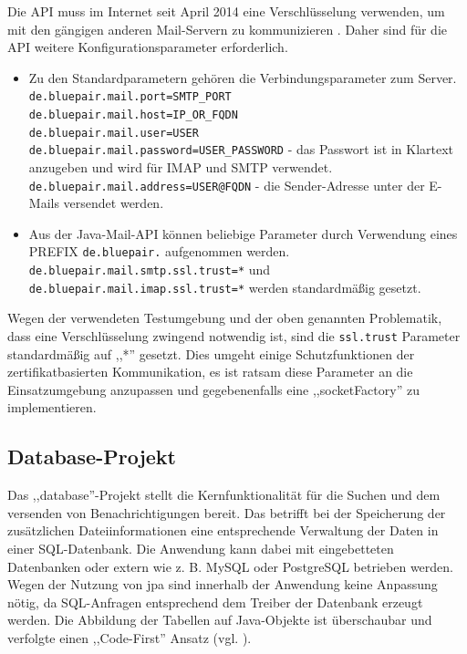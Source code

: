 \documentclass[oneside, ngerman, toc=bibliography,bibliography=totoc,listof=entryprefix, open=right,numbers=noenddot,fontsize=12pt]{scrbook}
\begin{document}
Die API muss im Internet seit April 2014 eine Verschlüsselung verwenden, um mit den gängigen anderen Mail-Servern zu kommunizieren \cite{sslmail}. Daher sind für die API weitere Konfigurationsparameter erforderlich.
\label{javamailc}
\begin{itemize}
    \item Zu den Standardparametern gehören die Verbindungsparameter zum Server.\\
    \verb|de.bluepair.mail.port=SMTP_PORT|\\
    \verb|de.bluepair.mail.host=IP_OR_FQDN|\\
    \verb|de.bluepair.mail.user=USER|\\ \verb|de.bluepair.mail.password=USER_PASSWORD| - das Passwort ist in Klartext anzugeben und wird für IMAP und SMTP verwendet. \\
    \verb|de.bluepair.mail.address=USER@FQDN| - die Sender-Adresse unter der E-Mails versendet werden. 
    \item Aus der Java-Mail-API können beliebige Parameter  durch Verwendung eines PREFIX \verb|de.bluepair.| aufgenommen werden.
    \verb|de.bluepair.mail.smtp.ssl.trust=*| und\\
    \verb|de.bluepair.mail.imap.ssl.trust=*| werden standardmäßig gesetzt.
    
\end{itemize}

Wegen der verwendeten Testumgebung und der oben genannten Problematik, dass eine Verschlüsselung zwingend notwendig ist, sind die \verb|ssl.trust| Parameter standardmäßig auf ,,*'' gesetzt. Dies umgeht einige Schutzfunktionen der zertifikatbasierten Kommunikation, es ist ratsam diese Parameter an die Einsatzumgebung anzupassen und gegebenenfalls eine ,,socketFactory'' zu implementieren. 

\subsection{Database-Projekt}
Das ,,database''-Projekt stellt die Kernfunktionalität für die Suchen und dem versenden von Benachrichtigungen bereit.
Das betrifft bei der Speicherung der zusätzlichen Dateiinformationen eine entsprechende Verwaltung der Daten in einer SQL-Datenbank.
Die Anwendung kann dabei mit eingebetteten Datenbanken oder extern wie z. B. {MySQL} oder {PostgreSQL} betrieben werden.
Wegen der Nutzung von \acrshort{jpa} sind innerhalb der Anwendung keine Anpassung nötig, da SQL-Anfragen entsprechend dem Treiber der Datenbank erzeugt werden.
Die Abbildung der Tabellen auf Java-Objekte ist überschaubar und verfolgte einen ,,Code-First'' Ansatz (vgl. \cite{wincodefirst}). 
\end{document}
